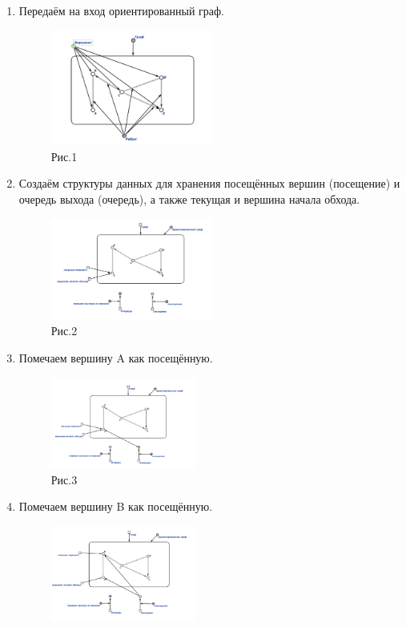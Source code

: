 \documentclass[10pt,a4paper,twocolumn]{article}
\begin{document}
\begin{enumerate}
	\item Передаём на вход ориентированный граф.
	\begin{figure}[h!]
		\includegraphics[width=0.5\textwidth]{img/1.png}
		\caption{Рис.1}
	\end{figure}
	\item Создаём структуры данных для хранения посещённых вершин (посещение) и очередь выхода (очередь), а также текущая и вершина начала обхода.
	\begin{figure}[h!]
		\includegraphics[width=0.5\textwidth]{img/2.png}
		\caption{Рис.2}
	\end{figure}
	\item Помечаем вершину A как посещённую.
    \begin{figure}[h]
		\includegraphics[width=0.45\textwidth]{img/3.png}
		\caption{Рис.3}
	\end{figure}
	\item Помечаем вершину B как посещённую.
	\begin{figure}[h]
		\includegraphics[width=0.45\textwidth]{img/4.png}

\end{figure}
\end{enumerate}
\end{document}
